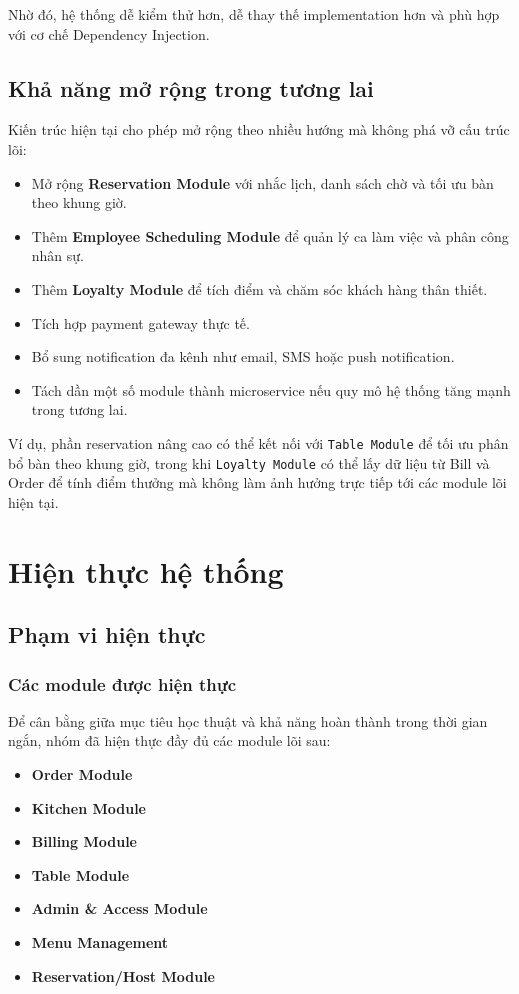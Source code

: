 \documentclass[12pt,a4paper]{article}
\begin{document}
Nhờ đó, hệ thống dễ kiểm thử hơn, dễ thay thế implementation hơn và phù hợp với cơ chế Dependency Injection.

\subsection{Khả năng mở rộng trong tương lai}

Kiến trúc hiện tại cho phép mở rộng theo nhiều hướng mà không phá vỡ cấu trúc lõi:
\begin{itemize}
    \item Mở rộng \textbf{Reservation Module} với nhắc lịch, danh sách chờ và tối ưu bàn theo khung giờ.
    \item Thêm \textbf{Employee Scheduling Module} để quản lý ca làm việc và phân công nhân sự.
    \item Thêm \textbf{Loyalty Module} để tích điểm và chăm sóc khách hàng thân thiết.
    \item Tích hợp payment gateway thực tế.
    \item Bổ sung notification đa kênh như email, SMS hoặc push notification.
    \item Tách dần một số module thành microservice nếu quy mô hệ thống tăng mạnh trong tương lai.
\end{itemize}

Ví dụ, phần reservation nâng cao có thể kết nối với \texttt{Table Module} để tối ưu phân bổ bàn theo khung giờ, trong khi \texttt{Loyalty Module} có thể lấy dữ liệu từ Bill và Order để tính điểm thưởng mà không làm ảnh hưởng trực tiếp tới các module lõi hiện tại.

\section{Hiện thực hệ thống}

\subsection{Phạm vi hiện thực}

\subsubsection{Các module được hiện thực}

Để cân bằng giữa mục tiêu học thuật và khả năng hoàn thành trong thời gian ngắn, nhóm đã hiện thực đầy đủ các module lõi sau:
\begin{itemize}
    \item \textbf{Order Module}
    \item \textbf{Kitchen Module}
    \item \textbf{Billing Module}
    \item \textbf{Table Module}
    \item \textbf{Admin \& Access Module}
    \item \textbf{Menu Management}
    \item \textbf{Reservation/Host Module}
\end{itemize}
\end{document}
